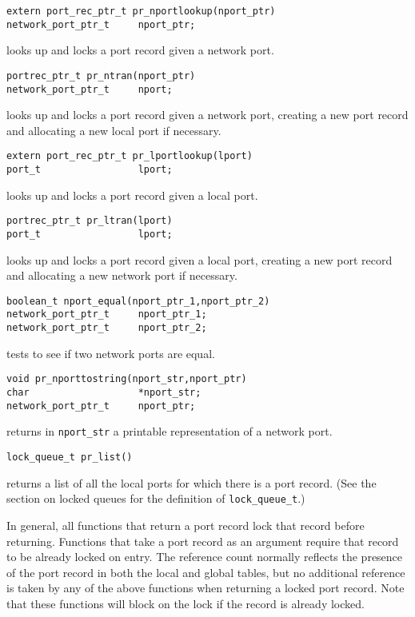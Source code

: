 \begin{verbatim}
extern port_rec_ptr_t pr_nportlookup(nport_ptr)
network_port_ptr_t     nport_ptr;
\end{verbatim}
looks up and locks a port record given a network port.

\begin{verbatim}
portrec_ptr_t pr_ntran(nport_ptr)
network_port_ptr_t     nport;
\end{verbatim}
looks up and locks a port record given a network port, creating a new port
record and allocating a new local port if necessary.

\begin{verbatim}
extern port_rec_ptr_t pr_lportlookup(lport)
port_t                 lport;
\end{verbatim}
looks up and locks a port record given a local port.

\begin{verbatim}
portrec_ptr_t pr_ltran(lport)
port_t                 lport;
\end{verbatim}
looks up and locks a port record given a local port, creating a new port
record and allocating a new network port if necessary.

\begin{verbatim}
boolean_t nport_equal(nport_ptr_1,nport_ptr_2)
network_port_ptr_t     nport_ptr_1;
network_port_ptr_t     nport_ptr_2;
\end{verbatim}
tests to see if two network ports are equal.

\begin{verbatim}
void pr_nporttostring(nport_str,nport_ptr)
char                   *nport_str;
network_port_ptr_t     nport_ptr;
\end{verbatim}
returns in \verb"nport_str" a printable representation of a network port.

\begin{verbatim}
lock_queue_t pr_list()
\end{verbatim}
returns a list of all the local ports for which there is a port record.
(See the section on locked queues for the definition of
\verb"lock_queue_t".)

In general, all functions that return a port record lock that record
before returning. Functions that take a port record as an argument
require that record to be already locked on entry. The reference count
normally reflects the presence of the port record in both the local
and global tables, but no additional reference is taken by any of the
above functions when returning a locked port record. Note that these
functions will block on the lock if the record is already locked.

